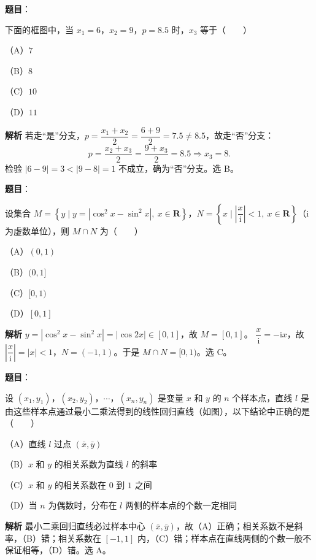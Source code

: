 \begin{answer}

\textbf{题目}：

下面的框图中，当 $x_1=6$，$x_2=9$，$p=8.5$ 时，$x_3$ 等于\mbox{（　　）}

（A）$7$

（B）$8$

（C）$10$

（D）$11$
\nopagebreak[4]
\begin{center}\end{center}
\nopagebreak[4]
\textbf{解析}
若走“是”分支，$p=\dfrac{x_1+x_2}2=\dfrac{6+9}2=7.5\ne8.5$，故走“否”分支：
\nopagebreak[4]
\[p=\frac{x_2+x_3}2=\frac{9+x_3}2=8.5\Longrightarrow x_3=8.\]
检验 $|6-9|=3<|9-8|=1$ 不成立，确为“否”分支。选 B。


\end{answer}
\begin{answer}

\textbf{题目}：

设集合 $M=\left\{y\mid y=|\cos^2x-\sin^2x|,\ x\in\mathbf R\right\}$，$N=\left\{x\mid\left|\dfrac x{\mathrm i}\right|<1,\ x\in\mathbf R\right\}$（$\mathrm i$ 为虚数单位），则 $M\cap N$ 为\mbox{（　　）}

（A）$(0,1)$

（B）$(0,1]$

（C）$[0,1)$

（D）$[0,1]$

\textbf{解析}
$y=|\cos^2x-\sin^2x|=|\cos2x|\in[0,1]$，故 $M=[0,1]$。
$\dfrac x{\mathrm i}=-\mathrm ix$，故 $\left|\dfrac x{\mathrm i}\right|=|x|<1$，$N=(-1,1)$。于是 $M\cap N=[0,1)$。选 C。


\end{answer}
\begin{answer}

\textbf{题目}：

设 $(x_1,y_1)$，$(x_2,y_2)$，$\cdots$，$(x_n,y_n)$ 是变量 $x$ 和 $y$ 的 $n$ 个样本点，直线 $l$ 是由这些样本点通过最小二乘法得到的线性回归直线（如图），以下结论中正确的是\mbox{（　　）}

（A）直线 $l$ 过点 $(\bar x,\bar y)$

（B）$x$ 和 $y$ 的相关系数为直线 $l$ 的斜率

（C）$x$ 和 $y$ 的相关系数在 $0$ 到 $1$ 之间

（D）当 $n$ 为偶数时，分布在 $l$ 两侧的样本点的个数一定相同
\nopagebreak[4]
\begin{center}\end{center}
\nopagebreak[4]
\textbf{解析}
最小二乘回归直线必过样本中心 $(\bar x,\bar y)$，故（A）正确；相关系数不是斜率，（B）错；相关系数在 $[-1,1]$ 内，（C）错；样本点在直线两侧的个数一般不保证相等，（D）错。选 A。


\end{answer}
